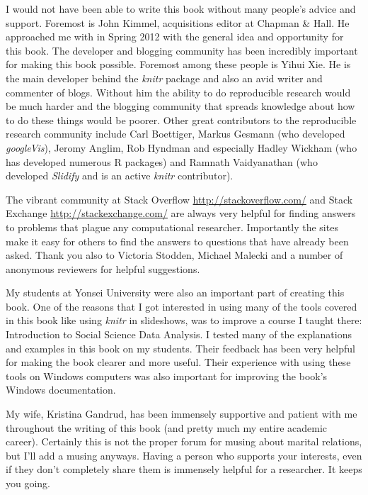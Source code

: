 \documentclass[krantz1]{krantz}
\begin{document}
I would not have been able to write this book without many people's advice and support. Foremost is John Kimmel, acquisitions editor at Chapman \& Hall. He approached me with in Spring 2012 with the general idea and opportunity for this book. The developer and blogging community has been incredibly important for making this book possible. Foremost among these people is Yihui Xie. He is the main developer behind the {\emph{knitr}} package and also an avid writer and commenter of blogs. Without him the ability to do reproducible research would be much harder and the blogging community that spreads knowledge about how to do these things would be poorer. Other great contributors to the reproducible research community include Carl Boettiger, Markus Gesmann (who developed {\emph{googleVis}}), Jeromy Anglim, Rob Hyndman and especially Hadley Wickham (who has developed numerous R packages) and Ramnath Vaidyanathan (who developed {\emph{Slidify}} and is an active {\emph{knitr}} contributor).

The vibrant community at Stack Overflow \url{http://stackoverflow.com/} and Stack Exchange \url{http://stackexchange.com/} are always very helpful for finding answers to problems that plague any computational researcher. Importantly the sites make it easy for others to find the answers to questions that have already been asked. Thank you also to Victoria Stodden, Michael Malecki and a number of anonymous reviewers for helpful suggestions.

My students at Yonsei University were also an important part of creating this book. One of the reasons that I got interested in using many of the tools covered in this book like using \emph{knitr} in slideshows, was to improve a course I taught there: Introduction to Social Science Data Analysis. I tested many of the explanations and examples in this book on my students. Their feedback has been very helpful for making the book clearer and more useful. Their experience with using these tools on Windows computers was also important for improving the book's Windows documentation.

My wife, Kristina Gandrud, has been immensely supportive and patient with me throughout the writing of this book (and pretty much my entire academic career). Certainly this is not the proper forum for musing about marital relations, but I'll add a musing anyways. Having a person who supports your interests, even if they don't completely share them is immensely helpful for a researcher. It keeps you going.


\tableofcontents
\end{document}

